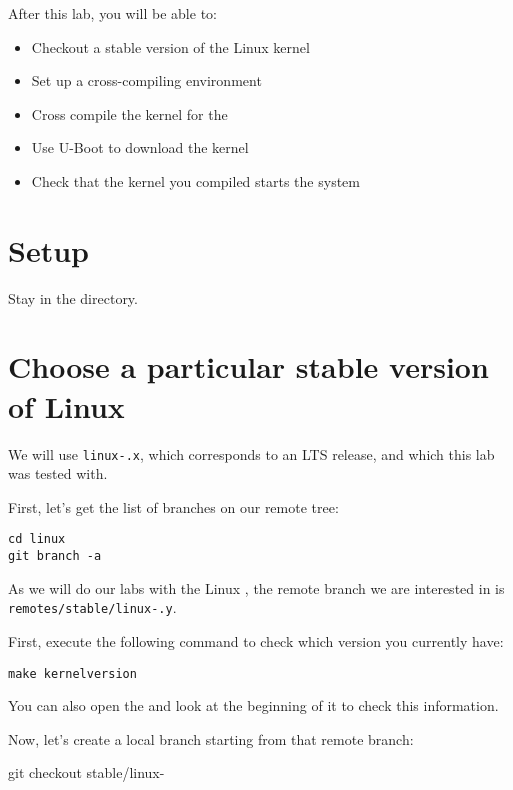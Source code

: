 
After this lab, you will be able to:
\begin{itemize}
\item Checkout a stable version of the Linux kernel
\item Set up a cross-compiling environment
\item Cross compile the kernel for the \labboarddescription
\item Use U-Boot to download the kernel
\item Check that the kernel you compiled starts the system
\end{itemize}

\section{Setup}

Stay in the  directory.

\section{Choose a particular stable version of Linux}

We will use \texttt{linux-\workingkernel.x}, which corresponds to an
LTS release, and which this lab was tested with.

First, let's get the list of branches on our  remote tree:

\begin{verbatim}
cd linux
git branch -a
\end{verbatim}

As we will do our labs with the Linux \workingkernel,
the remote branch we are interested in is
\texttt{remotes/stable/linux-\workingkernel.y}.

First, execute the following command to check which version you
currently have:

\begin{verbatim}
make kernelversion
\end{verbatim}

You can also open the  and look at the beginning of it
to check this information.

Now, let's create a local branch starting from that remote branch:
\begin{bashinput}
git checkout stable/linux-%
\end{bashinput}

